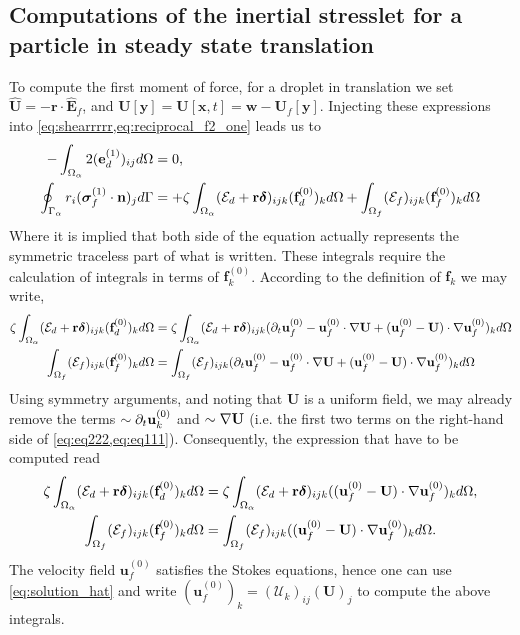 \subsection{Computations of the inertial stresslet for a particle in steady state translation}

To compute the first moment of force, for a droplet in translation we set $\hat{\textbf{U}} = - \textbf{r} \cdot \hat{\textbf{E}}_f$, and $\textbf{U}[\textbf{y}] = \textbf{U}[\textbf{x},t] = \textbf{w} - \textbf{U}_f[\textbf{y}]$. 
Injecting these expressions into \ref{eq:shearrrrr,eq:reciprocal_f2_one} leads us to
\begin{align}
    - \intO{
        2(\textbf{e}_d^{(1)})_{ij}
   }
    &= 0, \\
    \intS{r_i (\bm\sigma_f^{(1)} \cdot \textbf{n})_j}
    &= 
    + \zeta\intO{(\mathcal{E}_d + \textbf{r}\bm\delta)_{ijk} (\textbf{f}_d^{(0)})_k }
    + \intOf{(\mathcal{E}_f )_{ijk}  (\textbf{f}^{(0)}_f)_k}
    \label{eq:stresslet}
\end{align}
Where it is implied that both side of the equation actually represents the symmetric traceless part of what is written.
These integrals require the calculation of integrals in terms of $\textbf{f}^{(0)}_k$. 
According to the definition of $\textbf{f}_k$ we may write, 
\begin{align}
    \label{eq:eq111}
    \zeta\intO{(\mathcal{E}_d + \textbf{r}\bm\delta)_{ijk} (\textbf{f}_d^{(0)})_k }
    &=
    \zeta\intO{(\mathcal{E}_d + \textbf{r}\bm\delta)_{ijk} 
    (
    \pddt \textbf{u}_f^{(0)}
    - \textbf{u}_f^{(0)} \cdot \grad \textbf{U}
    + (\textbf{u}_f^{(0)} - \textbf{U})\cdot \grad \textbf{u}_f^{(0)}
    )_k }\\
    \intOf{(\mathcal{E}_f )_{ijk}  (\textbf{f}^{(0)}_f)_k}
    &=
    \intOf{(\mathcal{E}_f )_{ijk}  
    (\pddt \textbf{u}_f^{(0)}
    - \textbf{u}_f^{(0)} \cdot \grad \textbf{U}
    + (\textbf{u}_f^{(0)} - \textbf{U})\cdot \grad \textbf{u}_f^{(0)}
    )_k}
    \label{eq:eq222}
\end{align}
Using symmetry arguments, and noting that  \textbf{U} is a uniform field, we may already remove the terms $\sim \partial_t \textbf{u}^{(0)}_k$ and $\sim \mathbf{\nabla} \textbf{U}$ (i.e. the first two terms on the right-hand side of \ref{eq:eq222,eq:eq111}). 
Consequently, the expression that have to be computed read
\begin{align}
    \zeta\intO{(\mathcal{E}_d + \textbf{r}\bm\delta)_{ijk} (\textbf{f}_d^{(0)})_k }
    &=
    \zeta\intO{(\mathcal{E}_d + \textbf{r}\bm\delta)_{ijk} 
    ( (\textbf{u}_f^{(0)} - \textbf{U})\cdot \grad \textbf{u}_f^{(0)}
    )_k },
    \label{eq:eq111222}
    \\
    \intOf{(\mathcal{E}_f )_{ijk}  (\textbf{f}^{(0)}_f)_k}
    &=
    \intOf{(\mathcal{E}_f )_{ijk}  
    ((\textbf{u}_f^{(0)} - \textbf{U})\cdot \grad \textbf{u}_f^{(0)}
    )_k}. 
    \label{eq:eq222222222}
\end{align}
The velocity field $\textbf{u}_f^{(0)}$ satisfies the Stokes equations, hence one can use \ref{eq:solution_hat} and write $(\textbf{u}_f^{(0)})_k = (\mathcal{U}_k)_{ij}(\textbf{U})_j$ to compute the above integrals. 

